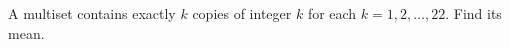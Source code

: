 A multiset contains exactly $ k $ copies of integer $ k $ for each $ k=1,2,\ldots,22 $. Find its mean.

